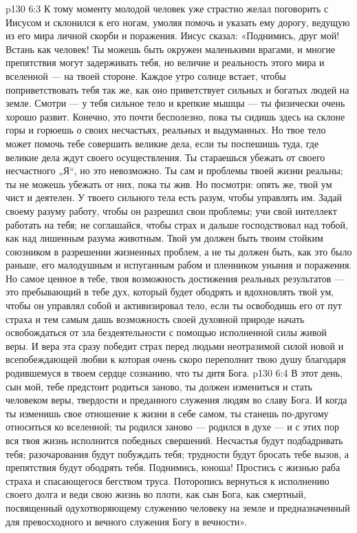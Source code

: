 \vs p130 6:3 К тому моменту молодой человек уже страстно желал поговорить с Иисусом и склонился к его ногам, умоляя помочь и указать ему дорогу, ведущую из его мира личной скорби и поражения. Иисус сказал: «Поднимись, друг мой! Встань как человек! Ты можешь быть окружен маленькими врагами, и многие препятствия могут задерживать тебя, но величие и реальность этого мира и вселенной --- на твоей стороне. Каждое утро солнце встает, чтобы поприветствовать тебя так же, как оно приветствует сильных и богатых людей на земле. Смотри --- у тебя сильное тело и крепкие мышцы --- ты физически очень хорошо развит. Конечно, это почти бесполезно, пока ты сидишь здесь на склоне горы и горюешь о своих несчастьях, реальных и выдуманных. Но твое тело может помочь тебе совершить великие дела, если ты поспешишь туда, где великие дела ждут своего осуществления. Ты стараешься убежать от своего несчастного „Я“, но это невозможно. Ты сам и проблемы твоей жизни реальны; ты не можешь убежать от них, пока ты жив. Но посмотри: опять же, твой ум чист и деятелен. У твоего сильного тела есть разум, чтобы управлять им. Задай своему разуму работу, чтобы он разрешил свои проблемы; учи свой интеллект работать на тебя; не соглашайся, чтобы страх и дальше господствовал над тобой, как над лишенным разума животным. Твой ум должен быть твоим стойким союзником в разрешении жизненных проблем, а не ты должен быть, как это было раньше, его малодушным и испуганным рабом и пленником уныния и поражения. Но самое ценное в тебе, твоя возможность достижения реальных результатов --- это пребывающий в тебе дух, который будет ободрять и вдохновлять твой ум, чтобы он управлял собой и активизировал тело, если ты освободишь его от пут страха и тем самым дашь возможность своей духовной природе начать освобождаться от зла бездеятельности с помощью исполненной силы живой веры. И вера эта сразу победит страх перед людьми неотразимой силой новой и всепобеждающей любви к  которая очень скоро переполнит твою душу благодаря родившемуся в твоем сердце сознанию, что ты дитя Бога.
\vs p130 6:4 В этот день, сын мой, тебе предстоит родиться заново, ты должен измениться и стать человеком веры, твердости и преданного служения людям во славу Бога. И когда ты изменишь свое отношение к жизни в себе самом, ты станешь по\hyp{}другому относиться ко вселенной; ты родился заново --- родился в духе --- и с этих пор вся твоя жизнь исполнится победных свершений. Несчастья будут подбадривать тебя; разочарования будут побуждать тебя; трудности будут бросать тебе вызов, а препятствия будут ободрять тебя. Поднимись, юноша! Простись с жизнью раба страха и спасающегося бегством труса. Поторопись вернуться к исполнению своего долга и веди свою жизнь во плоти, как сын Бога, как смертный, посвященный одухотворяющему служению человеку на земле и предназначенный для превосходного и вечного служения Богу в вечности».
